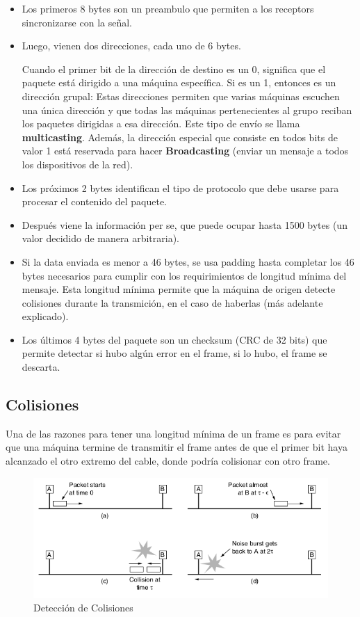 \begin{itemize}
  \item Los primeros 8 bytes son un preambulo que permiten a los receptors sincronizarse con la señal.
  \item Luego, vienen dos direcciones, cada uno de 6 bytes. 
  
  Cuando el primer bit de la dirección de destino es un 0, significa que el paquete está dirigido a una máquina específica.  Si es un 1, entonces es un dirección grupal: Estas direcciones permiten que varias máquinas escuchen una única dirección y que todas las máquinas pertenecientes al grupo reciban los paquetes dirigidas a esa dirección. Este tipo de envío se llama \textbf{multicasting}. Además, la dirección especial que consiste en todos bits de valor 1 está reservada para hacer \textbf{Broadcasting} (enviar un mensaje a todos los dispositivos de la red).
  \item Los próximos 2 bytes identifican el tipo de protocolo que debe usarse para procesar el contenido del paquete.
  \item Después viene la información per se, que puede ocupar hasta 1500 bytes (un valor decidido de manera arbitraria).
  \item Si la data enviada es menor a 46 bytes, se usa padding hasta completar los 46 bytes necesarios para cumplir con los requirimientos de longitud mínima del mensaje. Esta longitud mínima permite que la máquina de origen detecte colisiones durante la transmición, en el caso de haberlas (más adelante explicado).
  \item Los últimos 4 bytes del paquete son un checksum (CRC de 32 bits) que permite detectar si hubo algún error en el frame, si lo hubo, el frame se descarta.
\end{itemize}

\subsection{Colisiones}
Una de las razones para tener una longitud mínima de un frame es para evitar que una máquina termine de transmitir el frame antes de que el primer bit haya alcanzado el otro extremo del cable, donde podría colisionar con otro frame.

\begin{figure}[H]
	\centering
	\includegraphics[width=\textwidth
]{images/deteccion-colisiones.png}
	\caption[Detección de Colisiones]{Detección de Colisiones}
	\label{fig:deteccion-colisiones}
\end{figure}

